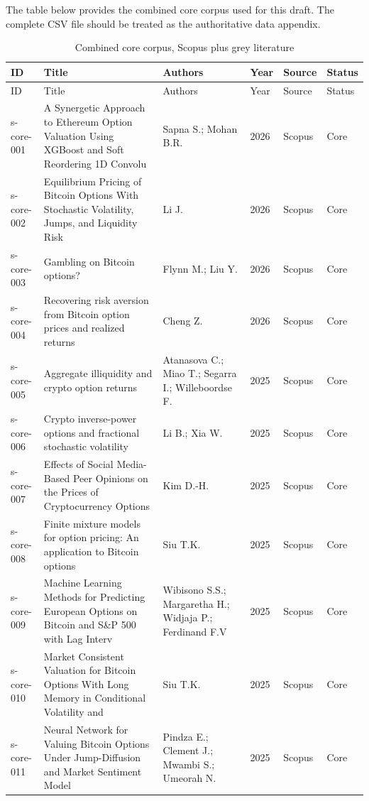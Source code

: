 \documentclass[11pt,a4paper]{article}
\begin{document}
The table below provides the combined core corpus used for this draft. The complete CSV file should be treated as the authoritative data appendix.

\begingroup
\renewcommand{\arraystretch}{1.35}
\scriptsize
\begin{longtable}{p{}p{}p{}p{}p{}p{}}
\caption{Combined core corpus, Scopus plus grey literature}\\
\toprule
ID & Title & Authors & Year & Source & Status \\
\midrule
\endfirsthead
\toprule
ID & Title & Authors & Year & Source & Status \\
\midrule
\endhead
s-core-001 & A Synergetic Approach to Ethereum Option Valuation Using XGBoost and Soft Reordering 1D Convolu & Sapna S.; Mohan B.R. & 2026 & Scopus & Core \\
s-core-002 & Equilibrium Pricing of Bitcoin Options With Stochastic Volatility, Jumps, and Liquidity Risk & Li J. & 2026 & Scopus & Core \\
s-core-003 & Gambling on Bitcoin options? & Flynn M.; Liu Y. & 2026 & Scopus & Core \\
s-core-004 & Recovering risk aversion from Bitcoin option prices and realized returns & Cheng Z. & 2026 & Scopus & Core \\
s-core-005 & Aggregate illiquidity and crypto option returns & Atanasova C.; Miao T.; Segarra I.; Willeboordse F. & 2025 & Scopus & Core \\
s-core-006 & Crypto inverse-power options and fractional stochastic volatility & Li B.; Xia W. & 2025 & Scopus & Core \\
s-core-007 & Effects of Social Media-Based Peer Opinions on the Prices of Cryptocurrency Options & Kim D.-H. & 2025 & Scopus & Core \\
s-core-008 & Finite mixture models for option pricing: An application to Bitcoin options & Siu T.K. & 2025 & Scopus & Core \\
s-core-009 & Machine Learning Methods for Predicting European Options on Bitcoin and S\&P 500 with Lag Interv & Wibisono S.S.; Margaretha H.; Widjaja P.; Ferdinand F.V & 2025 & Scopus & Core \\
s-core-010 & Market Consistent Valuation for Bitcoin Options With Long Memory in Conditional Volatility and  & Siu T.K. & 2025 & Scopus & Core \\
s-core-011 & Neural Network for Valuing Bitcoin Options Under Jump-Diffusion and Market Sentiment Model & Pindza E.; Clement J.; Mwambi S.; Umeorah N. & 2025 & Scopus & Core \\

\end{longtable}
\end{document}
